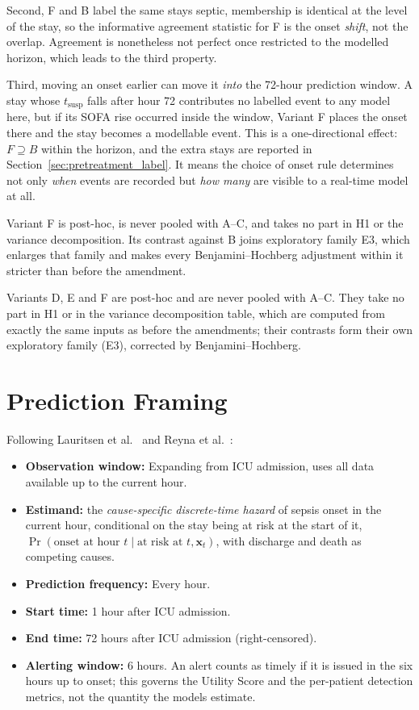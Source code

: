 Second, F and B label the same stays septic, membership is identical at the
level of the stay, so the informative agreement statistic for F is the onset
\emph{shift}, not the overlap. Agreement is nonetheless not perfect once
restricted to the modelled horizon, which leads to the third property.

Third, moving an onset earlier can move it \emph{into} the 72-hour prediction
window. A stay whose $t_{\text{susp}}$ falls after hour 72 contributes no
labelled event to any model here, but if its SOFA rise occurred inside the
window, Variant F places the onset there and the stay becomes a modellable
event. This is a one-directional effect: $F \supseteq B$ within the horizon, and
the extra stays are reported in Section~\ref{sec:pretreatment_label}. It means
the choice of onset rule determines not only \emph{when} events are recorded but
\emph{how many} are visible to a real-time model at all.

Variant F is post-hoc, is never pooled with A--C, and takes no part in H1 or the
variance decomposition. Its contrast against B joins exploratory family E3,
which enlarges that family and makes every Benjamini--Hochberg adjustment within
it stricter than before the amendment.

Variants D, E and F are post-hoc and are never pooled with A--C. They take no
part in H1 or in the variance decomposition table, which are computed from
exactly the same inputs as before the amendments; their contrasts form their own
exploratory family (E3), corrected by Benjamini--Hochberg.


\section{Prediction Framing}
\label{sec:framing}

Following Lauritsen et al.\ \cite{lauritsen2021framing} and Reyna et al.\
\cite{reyna2020utility}:

\begin{itemize}
    \item \textbf{Observation window:} Expanding from ICU admission, uses all
    data available up to the current hour.
    \item \textbf{Estimand:} the \emph{cause-specific discrete-time hazard} of
    sepsis onset in the current hour, conditional on the stay being at risk at
    the start of it, $\Pr(\text{onset at hour } t \mid \text{at risk at } t,
    \mathbf{x}_t)$, with discharge and death as competing causes.
    \item \textbf{Prediction frequency:} Every hour.
    \item \textbf{Start time:} 1 hour after ICU admission.
    \item \textbf{End time:} 72 hours after ICU admission (right-censored).
    \item \textbf{Alerting window:} 6 hours. An alert counts as timely if it is
    issued in the six hours up to onset; this governs the Utility Score and the
    per-patient detection metrics, not the quantity the models estimate.
\end{itemize}

